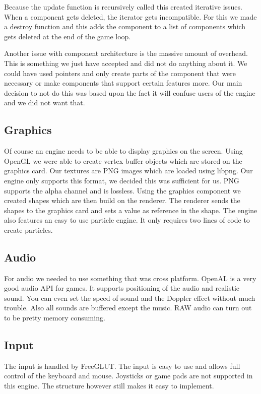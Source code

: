 \documentclass[acmtoplas,acmnow]{acmtrans2m}
\begin{document}
Because the update function is recursively called this created iterative issues. When a component gets deleted, the iterator gets incompatible. For this we made a destroy function and this adds the component to a list of components which gets deleted at the end of the game loop.

Another issue with component architecture is the massive amount of overhead. This is something we just have accepted and did not do anything about it. We could have used pointers and only create parts of the component that were necessary or make components that support certain features more. Our main decision to not do this was based upon the fact it will confuse users of the engine and we did not want that.

\subsection{Graphics}
Of course an engine needs to be able to display graphics on the screen. Using OpenGL we were able to create vertex buffer objects which are stored on the graphics card. Our textures are PNG images which are loaded using libpng. Our engine only supports this format, we decided this was sufficient for us. PNG supports the alpha channel and is lossless. Using the graphics component we created shapes which are then build on the renderer. The renderer sends the shapes to the graphics card and sets a value as reference in the shape. The engine also features an easy to use particle engine. It only requires two lines of code to create particles.

\subsection{Audio}
For audio we needed to use something that was cross platform. OpenAL is a very good audio API for games. It supports positioning of the audio and realistic sound. You can even set the speed of sound and the Doppler effect without much trouble. Also all sounds are buffered except the music. RAW audio can turn out to be pretty memory consuming.

\subsection{Input}
The input is handled by FreeGLUT. The input is easy to use and allows full control of the keyboard and mouse. Joysticks or game pads are not supported in this engine. The structure however still makes it easy to implement.
\end{document}
